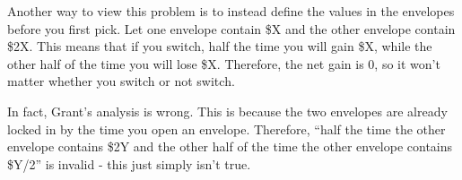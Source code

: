 \documentclass{article}
\begin{document}
Another way to view this problem is to instead define the values in the envelopes before you first pick. Let one envelope contain \$X and the other envelope contain \$2X. This means that if you switch, half the time you will gain \$X, while the other half of the time you will lose \$X. Therefore, the net gain is $0$, so it won't matter whether you switch or not switch.

In fact, Grant's analysis is wrong. This is because the two envelopes are already locked in by the time you open an envelope. Therefore, ``half the time the other envelope contains \$2Y and the other half of the time the other envelope contains \$Y/2'' is invalid - this just simply isn't true.

\newpage
\end{document}
